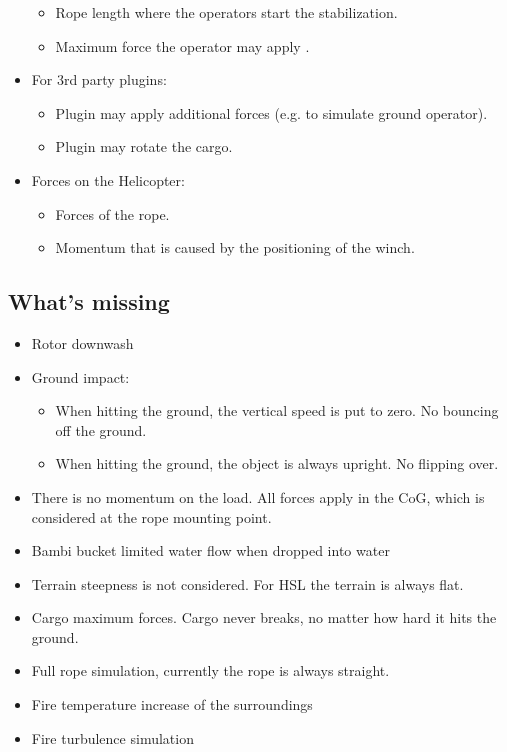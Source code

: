 \documentclass[10pt,a4]{scrartcl}
\begin{document}
\begin{itemize}
\begin{itemize}
\item Rope length where the operators start the stabilization.
\item Maximum force the operator may apply .
\end{itemize}
\item For 3rd party plugins:
\begin{itemize}
\item Plugin may apply additional forces (e.g. to simulate ground operator).
\item Plugin may rotate the cargo.
\end{itemize}
\item Forces on the Helicopter:
\begin{itemize}
\item Forces of the rope.
\item Momentum that is caused by the positioning of the winch.
\end{itemize}
\end{itemize}

\subsection{What's missing}

\begin{itemize}
\item Rotor downwash
\item Ground impact:
\begin{itemize}
\item When hitting the ground, the vertical speed is put to zero. No bouncing off the ground.
\item When hitting the ground, the object is always upright. No flipping over.
\end{itemize}
\item There is no momentum on the load. All forces apply in the CoG, which is considered at the rope mounting point.
\item Bambi bucket limited water flow when dropped into water
\item Terrain steepness is not considered. For HSL the terrain is always flat.
\item Cargo maximum forces. Cargo never breaks, no matter how hard it hits the ground.
\item Full rope simulation, currently the rope is always straight.
\item Fire temperature increase of the surroundings
\item Fire turbulence simulation
\end{itemize}
\end{document}
